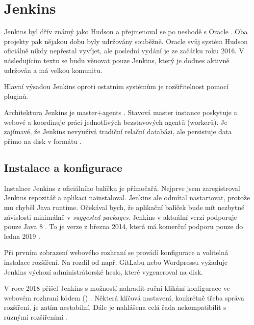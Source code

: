 \section{Jenkins}
\label{sec:jenkins}
    Jenkins byl dřív známý jako Hudson a přejmenoval se po neshodě s Oracle \cite{jenkins-hudson}. Oba projekty pak nějakou dobu byly udržovány souběžně. Oracle svůj systém Hudson oficiálně nikdy nepřestal vyvíjet, ale poslední vydání je ze začátku roku 2016. V následujícím textu se budu věnovat pouze Jenkins, který je dodnes aktivně udržován a má velkou komunitu.

    Hlavní výsadou Jenkins oproti ostatním \CICD systémům je rozšiřitelnost pomocí pluginů.

    Architektura Jenkins je master+agents \cite{jenkins-architecture}. Stavová master instance poskytuje  a webové  a koordinuje práci jednotlivých bezstavových agentů (workerů). Je zajímavé, že Jenkins nevyužívá tradiční relační databázi, ale persistuje data přímo na disk v formátu .

    \subsection{Instalace a konfigurace}
        Instalace Jenkins z oficiálního balíčku je přímočařá. Nejprve jsem zaregistroval Jenkins  repozitář  a aplikaci nainstaloval. Jenkins ale odmítal nastartovat, protože mu chyběl Java runtime. Očekával bych, že aplikační balíček bude mít nezbytné závislosti minimálně v \textit{suggested packages}. Jenkins v aktuální verzi podporuje pouze Java 8 \cite{jenkins-java}. To je  verze z března 2014, která má komerční podporu pouze do ledna 2019 \cite{oracle-eol}.

        Při prvním zobrazení webového rozhraní se provádí konfigurace a volitelná instalace rozšíření. Na rozdíl od např. GitLabu nebo Wordpressu vyžaduje Jenkins výchozí administrátorské heslo, které vygeneroval na disk.

        V roce 2018 přišel Jenkins s možností nahradit ruční klikání konfigurace ve webovém rozhraní kódem () \cite{jenkins-casc}. Některá klíčová nastavení, konkrétně třeba správa rozšíření, je zatím nestabilní. Dále je nahlášena celá řada nekompatibilit s různými rozšířeními .

